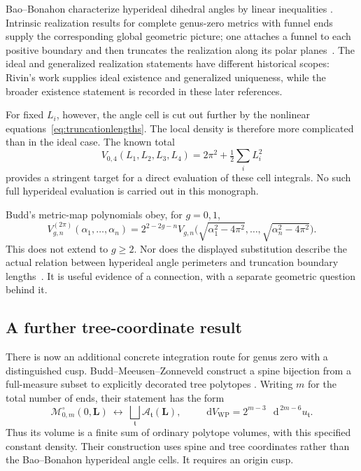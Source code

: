 \documentclass[11pt,a4paper]{article}
\numberwithin{equation}{section}
\theoremstyle{definition}
\theoremstyle{remark}
\newcommand{\dd}{\mathop{}\!\mathrm d}
\newcommand{\WP}{\mathrm{WP}}
\newcommand{\M}{\mathcal M}
\newcommand{\dV}{\dd V_{\WP}}
\newcommand{\lengths}{\mathbf L}
\begin{document}
Bao--Bonahon characterize hyperideal dihedral angles by linear inequalities
\cite{BaoBonahon}. Intrinsic realization results for complete genus-zero
metrics with funnel ends supply the corresponding global geometric picture;
one attaches a funnel to each positive boundary and then truncates the
realization along its polar planes~\cite{Schlenker,Fillastre}. The ideal
and generalized realization statements have different historical scopes:
Rivin's work supplies ideal existence and generalized uniqueness, while
the broader existence statement is recorded in these later references.

For fixed $L_i$, however, the angle cell is cut out further by the nonlinear
equations~\eqref{eq:truncationlengths}. The local density is therefore more
complicated than in the ideal case. The known total
\[
 V_{0,4}(L_1,L_2,L_3,L_4)=2\pi^2+\tfrac12\sum_iL_i^2
\]
provides a stringent target for a direct evaluation of these cell integrals.
No such full hyperideal evaluation is carried out in this monograph.

Budd's metric-map polynomials obey, for $g=0,1$,
\begin{equation}
 V_{g,n}^{(2\pi)}(\alpha_1,\ldots,\alpha_n)
 =2^{2-2g-n}V_{g,n}\bigl(\sqrt{\alpha_1^2-4\pi^2},\ldots,
                         \sqrt{\alpha_n^2-4\pi^2}\bigr).
 \label{eq:buddidentity}
\end{equation}
This does not extend to $g\ge2$. Nor does the displayed substitution describe
the actual relation between hyperideal angle perimeters and truncation
boundary lengths~\cite[Corollary 2 and Section 1.3]{Budd}. It is useful
evidence of a connection, with a separate geometric question behind it.

\subsection{A further tree-coordinate result}

There is now an additional concrete integration route for genus zero with
a distinguished cusp. Budd--Meeusen--Zonneveld construct a spine bijection
from a full-measure subset to explicitly decorated tree polytopes
\cite[Theorem 1]{BMZ}. Writing $m$ for the total number of ends, their
statement has the form
\begin{equation}
 \M_{0,m}^{\circ}(0,\lengths)\ \longleftrightarrow\
 \bigsqcup_{\mathfrak t}\mathcal A_{\mathfrak t}(\lengths),
 \qquad
 \dV=2^{m-3}\,\dd^{\,2m-6}u_{\mathfrak t}.
 \label{eq:treevolume}
\end{equation}
Thus its volume is a finite sum of ordinary polytope volumes, with this
specified constant density. Their construction uses spine and tree
coordinates rather than the Bao--Bonahon hyperideal angle cells. It
requires an origin cusp.
\end{document}
